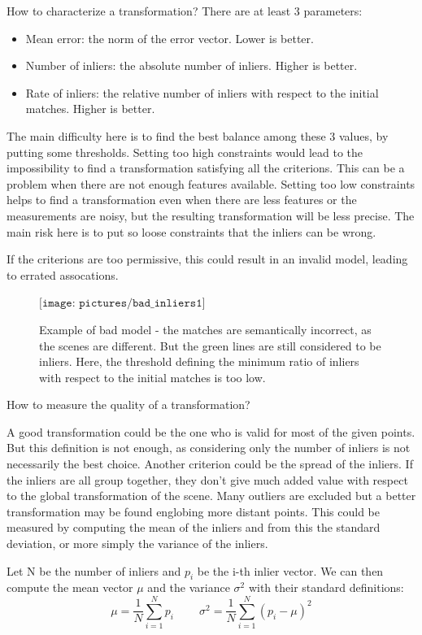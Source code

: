 How to characterize a transformation? There are at least 3 parameters:
\begin{itemize}
\item Mean error: the norm of the error vector. Lower is better.
\item Number of inliers: the absolute number of inliers. Higher is better.
\item Rate of inliers: the relative number of inliers with respect to the initial matches. Higher is better.
\end{itemize}

The main difficulty here is to find the best balance among these 3 values, by putting some thresholds. Setting too high constraints would lead to the impossibility to find a transformation satisfying all the criterions. This can be a problem when there are not enough features available. Setting too low constraints helps to find a transformation even when there are less features or the measurements are noisy, but the resulting transformation will be less precise. The main risk here is to put so loose constraints that the inliers can be wrong.

If the criterions are too permissive, this could result in an invalid model, leading to errated assocations. 

\begin{figure}[H]
\centering$
\texttt{[image: pictures/bad\_inliers1]}$
\caption{Example of bad model - the matches are semantically incorrect, as the scenes are different. But the green lines are still considered to be inliers. Here, the threshold defining the minimum ratio of inliers with respect to the initial matches is too low.}
\end{figure}

How to measure the quality of a transformation?

A good transformation could be the one who is valid for most of the given points. But this definition is not enough, as considering only the number of inliers is not necessarily the best choice. Another criterion could be the spread of the inliers. If the inliers are all group together, they don't give much added value with respect to the global transformation of the scene. Many outliers are excluded but a better transformation may be found englobing more distant points. This could be measured by computing the mean of the inliers and from this the standard deviation, or more simply the variance of the inliers.

Let N be the number of inliers and $p_i$ be the i-th inlier vector. We can then compute the mean vector $\mu$ and the variance $\sigma^2$ with their standard definitions:
\[
\mu = \frac{1}{N} \sum_{i=1}^N{p_i}
\;\;\;\;\;\;\;\;
\sigma^2 = \frac{1}{N} \sum_{i=1}^N{(p_i - \mu)^2}
\]

